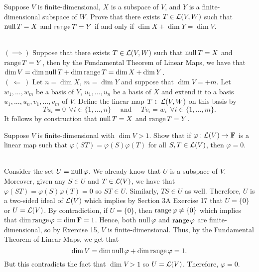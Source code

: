 \begin{exercise}
    Suppose $V$ is finite-dimensional, $X$ is a subspace of $V$, and $Y$ is a finite-dimensional subspace of $W$. Prove that there exists $T \in \mathcal{L}(V,W)$ such that $\operatorname{\text{null}} T = X$ and $\operatorname{\text{range}} T = Y$ if and only if $\dim X + \dim Y = \dim V$. \\
\end{exercise}

\begin{solution}
    \\ $( \implies )$ Suppose that there exists $T \in \mathcal{L}(V,W)$ such that $\operatorname{\text{null}} T = X$ and $\operatorname{\text{range}} T = Y$, then by the Fundamental Theorem of Linear Maps, we have that $\dim V = \dim \operatorname{\text{null}} T + \dim \operatorname{\text{range}} T = \dim X + \dim Y$. \\
    $( \ \Longleftarrow \ )$ Let $n = \dim X$, $m = \dim Y$ and suppose that $\dim V = +m$. Let $w_1, ..., w_m$ be a basis of $Y$, $u_1, ..., u_n$ be a basis of $X$ and extend it to a basis $u_1, ..., u_n, v_1, ..., v_m$ of $V$. Define the linear map $T \in \mathcal{L}(V,W)$ on this basis by
    $$Tu_i = 0 \ \ \forall i \in \{1, ...,n\} \quad \text{ and } \quad Tv_i = w_i \ \ \forall i \in \{1, ..., m\}.$$
    It follows by construction that $\operatorname{\text{null}} T = X$ and $\operatorname{\text{range}} T = Y$. \\
\end{solution}

\begin{exercise}
    Suppose $V$ is finite-dimensional with $\dim V > 1$. Show that if $\varphi : \mathcal{L}(V) \to \mathbf{F}$ is a linear map such that $\varphi(ST) = \varphi(S) \varphi(T)$ for all $S,T \in \mathcal{L}(V)$, then $\varphi = 0$.  \\
\end{exercise}

\begin{solution}
    \\ Consider the set $U = \operatorname{\text{null}} \varphi$. We already know that $U$ is a subspace of $V$. Moreover, given any $S \in U$ and $T \in \mathcal{L}(V)$, we have that $\varphi(ST) = \varphi(S) \varphi(T) = 0$ so $ST \in U$. Similarly, $TS \in U$ as well. Therefore, $U$ is a two-sided ideal of $\mathcal{L}(V)$ which implies by Section 3A Exercise 17 that $U = \{0\}$ or $U = \mathcal{L}(V)$. By contradiction, if $U = \{0\}$, then $\operatorname{\text{range}} \varphi \neq \{0\}$ which implies that $\dim \operatorname{\text{range}} \varphi = \dim \mathbf{F} = 1$. Hence, both $\operatorname{\text{null}} \varphi$ and $\operatorname{\text{range}} \varphi$ are finite-dimensional, so by Exercise 15, $V$ is finite-dimensional. Thus, by the Fundamental Theorem of Linear Maps, we get that
    $$\dim V = \dim \operatorname{\text{null}} \varphi + \dim \operatorname{\text{range}} \varphi = 1.$$
    But this contradicts the fact that $\dim V > 1$ so $U = \mathcal{L}(V)$. Therefore, $\varphi = 0$. \\
\end{solution}


